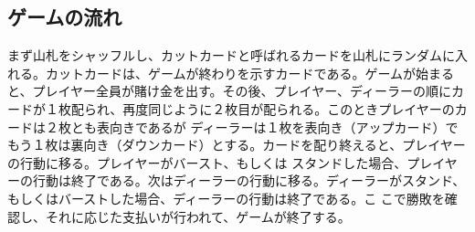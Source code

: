\subsection{ゲームの流れ}
まず山札をシャッフルし、カットカードと呼ばれるカードを山札にランダムに入れる。カットカードは、ゲームが終わりを示すカードである。ゲームが始まると、プレイヤー全員が賭け金を出す。その後、プレイヤー、ディーラーの順にカードが１枚配られ、再度同じように２枚目が配られる。このときプレイヤーのカードは２枚とも表向きであるが
ディーラーは１枚を表向き（アップカード）でもう１枚は裏向き（ダウンカード）とする。カードを配り終えると、プレイヤーの行動に移る。プレイヤーがバースト、もしくは
スタンドした場合、プレイヤーの行動は終了である。次はディーラーの行動に移る。ディーラーがスタンド、もしくはバーストした場合、ディーラーの行動は終了である。こ
こで勝敗を確認し、それに応じた支払いが行われて、ゲームが終了する。
